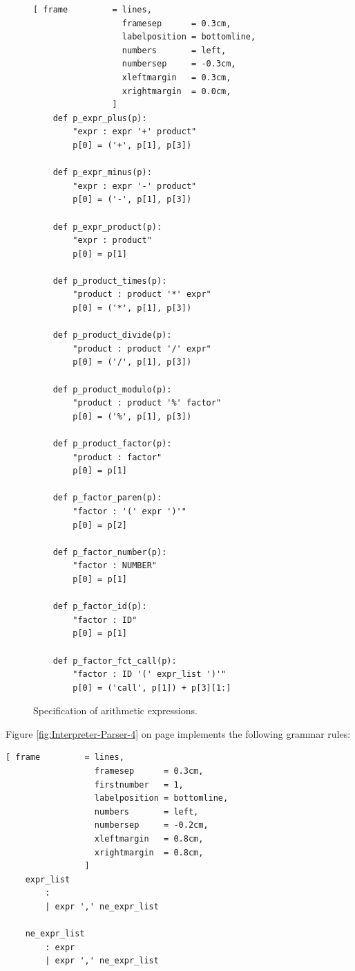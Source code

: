 \begin{figure}[!ht]
\centering
\begin{Verbatim}[ frame         = lines, 
                  framesep      = 0.3cm, 
                  labelposition = bottomline,
                  numbers       = left,
                  numbersep     = -0.3cm,
                  xleftmargin   = 0.3cm,
                  xrightmargin  = 0.0cm,
                ]
    def p_expr_plus(p):
        "expr : expr '+' product"
        p[0] = ('+', p[1], p[3])
        
    def p_expr_minus(p):
        "expr : expr '-' product"
        p[0] = ('-', p[1], p[3])
    
    def p_expr_product(p):
        "expr : product"
        p[0] = p[1]
        
    def p_product_times(p):
        "product : product '*' expr"
        p[0] = ('*', p[1], p[3])
        
    def p_product_divide(p):
        "product : product '/' expr"
        p[0] = ('/', p[1], p[3])
    
    def p_product_modulo(p):
        "product : product '%' factor"
        p[0] = ('%', p[1], p[3])
    
    def p_product_factor(p):
        "product : factor"
        p[0] = p[1]
    
    def p_factor_paren(p):
        "factor : '(' expr ')'"
        p[0] = p[2]
    
    def p_factor_number(p):
        "factor : NUMBER"
        p[0] = p[1]
    
    def p_factor_id(p):
        "factor : ID"
        p[0] = p[1]
    
    def p_factor_fct_call(p):
        "factor : ID '(' expr_list ')'"
        p[0] = ('call', p[1]) + p[3][1:]
\end{Verbatim}
\vspace*{-0.3cm} %
\caption{Specification of arithmetic expressions.}
\label{fig:Interpreter-Parser-3}
\end{figure}
\pagebreak
\vspace*{\fill}
\pagebreak

Figure \ref{fig:Interpreter-Parser-4} on page \pageref{fig:Interpreter-Parser-4} implements the following
grammar rules:
\begin{Verbatim}[ frame         = lines, 
                  framesep      = 0.3cm, 
                  firstnumber   = 1,
                  labelposition = bottomline,
                  numbers       = left,
                  numbersep     = -0.2cm,
                  xleftmargin   = 0.8cm,
                  xrightmargin  = 0.8cm,
                ]
    expr_list
        :
        | expr ',' ne_expr_list
    
    ne_expr_list
        : expr
        | expr ',' ne_expr_list
\end{Verbatim}




